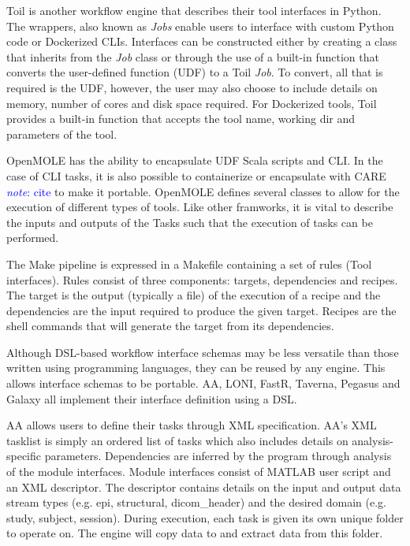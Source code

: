 \documentclass{report}
\newcommand{\note}[1]{\textcolor{blue}{\textit{note}: #1}}
\begin{document}
            Toil is another workflow engine that describes their tool interfaces
            in Python. The wrappers, also known as \textit{Jobs} enable users to
            interface with custom Python code or Dockerized \cite{merkel2014docker} 
            CLIs. Interfaces can be constructed either by creating a class that
            inherits from the \textit{Job} class or through the use of a 
            built-in function that converts the user-defined function (UDF) to a 
            Toil \textit{Job}. To convert, all that is required is the UDF,
            however, the user may also choose to include details on memory, 
            number of cores and disk space required. For Dockerized tools, Toil
            provides a built-in function that accepts the tool name, working dir
            and parameters of the tool.

            OpenMOLE has the ability to encapsulate UDF Scala scripts and CLI. 
            In the case of CLI tasks, it is also possible to containerize or 
            encapsulate with CARE \note{cite} to make it portable. OpenMOLE
            defines several classes to allow for the execution of different 
            types of tools. Like other framworks, it is vital to describe the
            inputs and outputs of the Tasks such that the execution of tasks 
            can be performed. 

            The Make pipeline is expressed in a Makefile containing a set of 
            rules (Tool interfaces). Rules consist of three components: targets, 
            dependencies and recipes. The target is the output (typically a 
            file) of the 
            execution of a recipe and the dependencies are the input required to 
            produce the given target. Recipes are the shell commands that will
            generate the target from its dependencies. 

            Although DSL-based workflow interface schemas may be less versatile
            than those written using programming languages, they
            can be reused by any engine. This allows interface schemas to be 
            portable. AA, LONI, FastR, Taverna, Pegasus and Galaxy all 
            implement their interface definition using a DSL.

            AA 
            allows users to define their tasks through XML specification. AA's 
            XML tasklist is simply an ordered list of tasks which also includes
            details on analysis-specific parameters. Dependencies are
            inferred by the program through analysis of the module interfaces.
            Module interfaces consist of MATLAB user script and an XML 
            descriptor. The descriptor contains details on the input and output
            data stream types (e.g. epi, structural, dicom\_header) 
            and the desired domain (e.g. study, subject, session). During 
            execution, each task is given its own unique folder to operate on. 
            The engine will copy data to and extract data from this folder.
\end{document}
